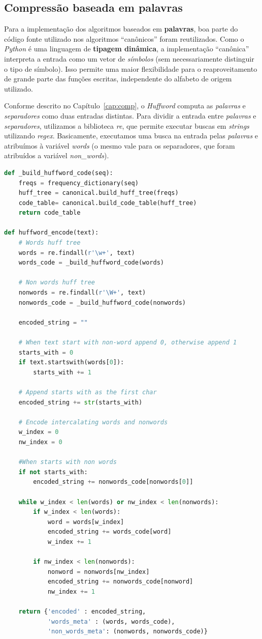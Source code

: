 \subsection{Compressão baseada em palavras}
Para a implementação dos algoritmos baseados em \textbf{palavras}, boa parte do código fonte utilizado nos algoritmos ``canônicos'' foram reutilizados.
Como o \emph{Python} é uma linguagem de \textbf{tipagem dinâmica}, a implementação ``canônica'' interpreta a entrada como um vetor de \emph{símbolos} (sem necessariamente distinguir o tipo de símbolo).
Isso permite uma maior flexibilidade para o reaproveitamento de grande parte das funções escritas, independente do alfabeto de origem utilizado. 

Conforme descrito no Capítulo~\ref{cap:comp}, o \emph{Huffword} computa as \emph{palavras} e \emph{separadores} como duas entradas distintas.
Para dividir a entrada entre \emph{palavras} e \emph{separadores}, utilizamos a biblioteca \emph{re}, que permite executar buscas em \emph{strings} utilizando \emph{regex}.
Basicamente, executamos uma busca na entrada pelas \emph{palavras} e atribuímos à variável \emph{words} (o mesmo vale para os separadores, que foram atribuídos a variável \emph{non\_words}).

\begin{lstlisting}[language=Python, caption=Função \emph{encode} para o \emph{Huffword}]
def _build_huffword_code(seq):
    freqs = frequency_dictionary(seq)
    huff_tree = canonical.build_huff_tree(freqs)
    code_table= canonical.build_code_table(huff_tree)
    return code_table
    
def huffword_encode(text):
    # Words huff tree
    words = re.findall(r'\w+', text)
    words_code = _build_huffword_code(words)

    # Non words huff tree
    nonwords = re.findall(r'\W+', text)
    nonwords_code = _build_huffword_code(nonwords)

    encoded_string = ""

    # When text start with non-word append 0, otherwise append 1
    starts_with = 0
    if text.startswith(words[0]):
        starts_with += 1
    
    # Append starts with as the first char
    encoded_string += str(starts_with)

    # Encode intercalating words and nonwords
    w_index = 0
    nw_index = 0

    #When starts with non words
    if not starts_with:
        encoded_string += nonwords_code[nonwords[0]]
    
    while w_index < len(words) or nw_index < len(nonwords):
        if w_index < len(words):
            word = words[w_index]
            encoded_string += words_code[word]
            w_index += 1
        
        if nw_index < len(nonwords):
            nonword = nonwords[nw_index]
            encoded_string += nonwords_code[nonword]
            nw_index += 1
    
    return {'encoded' : encoded_string,
            'words_meta' : (words, words_code),
            'non_words_meta': (nonwords, nonwords_code)}
\end{lstlisting}



